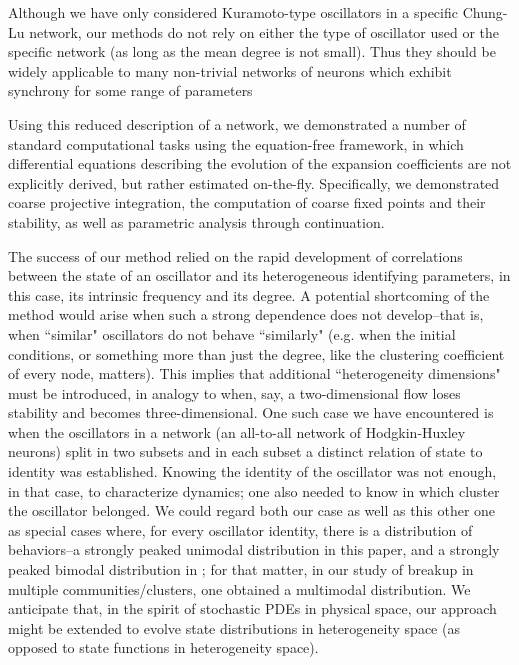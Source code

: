 \documentclass[numbers]{frontiersSCNS}
\begin{document}
Although we have only considered Kuramoto-type oscillators in a specific Chung-Lu network,
our methods do not rely on either the type of oscillator used or the specific network (as long as the mean degree is not small). 
%
Thus they should be widely applicable to many non-trivial networks of neurons which exhibit synchrony for some range of parameters

Using this reduced description of a network, we demonstrated a number of standard computational tasks using the
equation-free framework, in which differential equations describing the evolution of the expansion coefficients
are not explicitly derived, but rather estimated on-the-fly. 
%
Specifically, we demonstrated coarse projective integration,
the computation of coarse fixed points and their stability, 
as well as parametric analysis through continuation. 

The success of our method relied on the rapid development of correlations between the state of an oscillator
and its heterogeneous identifying parameters, in this case, its intrinsic frequency and its degree. 
%
A potential shortcoming of the method would arise when such a strong dependence does not develop--that is,
when ``similar" oscillators do not behave ``similarly"
(e.g. when the initial conditions, or something more than just the degree,
like the clustering coefficient of every node, matters).
%
This implies that additional ``heterogeneity dimensions" must be introduced,
in analogy to when, say, a two-dimensional flow loses stability and becomes three-dimensional.
%
One such case we have encountered \cite{Moon2014} is when
the oscillators in a network (an all-to-all network of Hodgkin-Huxley neurons) split in two subsets 
and in each subset a distinct relation of state to identity was established.
%
Knowing the identity of the oscillator was not enough, in that case, to characterize dynamics; one also needed to know in
which cluster the oscillator belonged. 
%
We could regard both our case as well as this other one as special cases where, for every oscillator identity,
there is a distribution of behaviors--a strongly peaked unimodal distribution in this paper, 
and a strongly peaked bimodal distribution in \cite{Moon2014}; for that matter, in our study of breakup in multiple 
communities/clusters, one obtained a multimodal distribution. 
%
We anticipate that, in the spirit of stochastic PDEs in physical space, our approach might be extended to
evolve state distributions in heterogeneity space (as opposed to state functions in heterogeneity space).
\end{document}
